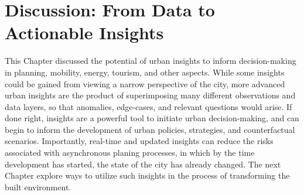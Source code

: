 \section{Discussion: From Data to Actionable Insights}

 {
  This Chapter discussed the potential of urban insights to inform decision-making in planning, mobility, energy, tourism, and other aspects. While some insights could be gained from viewing a narrow perspective of the city, more advanced urban insights are the product of superimposing many different observations and data layers, so that anomalies, edge-cases, and relevant questions would arise. If done right, insights are a powerful tool to initiate urban decision-making, and can begin to inform the development of urban policies, strategies, and counterfactual scenarios. Importantly, real-time and updated insights can reduce the risks associated with asynchronous planing processes, in which by the time development has started, the state of the city has already changed.
  \newline
  The next Chapter explore ways to utilize such insights in the process of transforming the built environment.
 }


